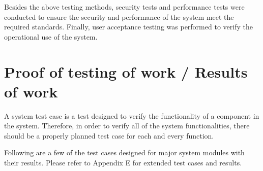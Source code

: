 \documentclass[12pt]{report}
\begin{document}
Besides the above testing methods, security tests and performance tests were conducted to ensure the security and performance of the system meet the required standards. Finally, user acceptance testing was performed to verify the operational use of the system.


\section{Proof of testing of work / Results of work}
A system test case is a test designed to verify the functionality of a component in the system. Therefore, in order to verify all of the system functionalities, there should be a properly planned test case for each and every function.

Following are a few of the test cases designed for major system modules with their results. Please refer to Appendix E for extended test cases and results. \newline
\end{document}
